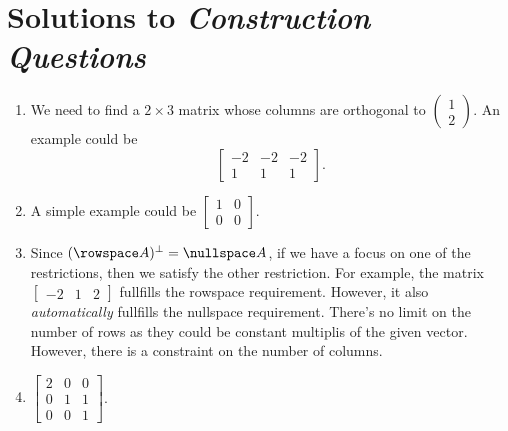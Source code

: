 \section{Solutions to \textit{Construction Questions}}
	\begin{enumerate}
		\item We need to find a \(2 \times 3\) matrix whose columns are orthogonal to \(\begin{pmatrix}1 \\ 2\end{pmatrix}\). An example could be 
			 \[\begin{bmatrix}-2 & -2 & -2\\ 1 & 1 & 1\end{bmatrix}.\]
		\item A simple example could be \(\begin{bmatrix}1 & 0 \\ 0 & 0\end{bmatrix}\).
		\item Since \((\rowspace A)^\perp = \nullspace A\), if we have a focus on one of the restrictions, then we satisfy the other restriction. For example,
			the matrix \(\begin{bmatrix}-2 & 1 & 2\end{bmatrix}\) fullfills the rowspace requirement. However, it also \emph{automatically} fullfills the
			nullspace requirement. There's no limit on the number of rows as they could be constant multiplis of the given vector. However, there is a 
			constraint on the number of columns.
		\item \(\begin{bmatrix}2 & 0 & 0 \\ 0 & 1 & 1 \\ 0 & 0 & 1\end{bmatrix}\).
	\end{enumerate}

